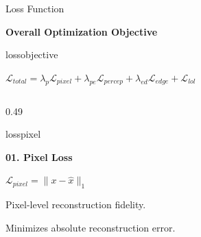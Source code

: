 ﻿\documentclass[
    11pt,%
    aspectratio=169,%
]{beamer}
\begin{document}
\begin{frame}{Loss Function}

\scriptsize


{\color{LossNavy}\bfseries Overall Optimization Objective}

\vspace{0.06cm}

\begin{beamercolorbox}[
    wd=0.88\textwidth,
    sep=0.08cm,
    rounded=true,
    center
]{lossobjective}

    $\displaystyle
    \mathcal{L}_{total}
    =
    \lambda_p\mathcal{L}_{pixel}
    +\lambda_{pe}\mathcal{L}_{percep}
    +\lambda_{ed}\mathcal{L}_{edge}
    +\mathcal{L}_{lol}
    $

\end{beamercolorbox}

\vspace{0.13cm}


\begin{columns}[T,onlytextwidth]


\begin{column}{0.49\textwidth}

\begin{beamercolorbox}[
    wd=\linewidth,
    sep=0.10cm,
    rounded=true
]{losspixel}

    {\color{LossNavy}\bfseries 01. Pixel Loss}

    \vspace{0.10cm}

    \centering
    $\displaystyle
    \mathcal{L}_{pixel}
    =
    \|x-\hat{x}\|_1
    $

    \vspace{0.08cm}

    \raggedright

    Pixel-level reconstruction fidelity.

    Minimizes absolute reconstruction error.

\end{beamercolorbox}

\end{column}


\end{columns}
\end{frame}
\end{document}

